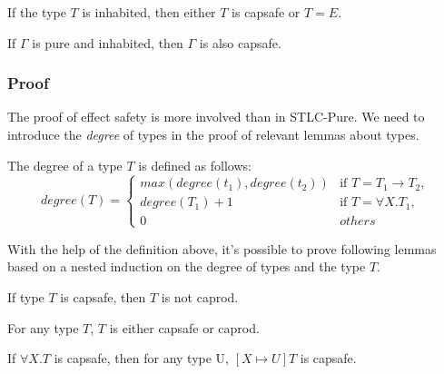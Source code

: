 \begin{lemma}
  If the type $T$ is inhabited, then either $T$ is capsafe or $T = E$.
\end{lemma}

\begin{theorem}
  If $\Gamma$ is pure and inhabited, then $\Gamma$ is also capsafe.
\end{theorem}


\subsubsection{Proof}

The proof of effect safety is more involved than in STLC-Pure. We need
to introduce the \emph{degree} of types in the proof of
relevant lemmas about types.

\begin{definition}
  The degree of a type $T$ is defined as follows:
  \begin{equation*}
    degree(T) =
    \begin{cases}
      max(degree(t_1), degree(t_2)) & \text{if } T = T_1 \to T_2,\\
      degree(T_1) + 1 & \text{if } T = \forall X.T_1,\\
      0 & others
    \end{cases}
  \end{equation*}
\end{definition}

With the help of the definition above, it's possible to prove
following lemmas based on a nested induction on the degree of types
and the type $T$.

\begin{lemma}
 If type $T$ is capsafe, then $T$ is not caprod.
\end{lemma}

\begin{lemma}
 For any type $T$, $T$ is either capsafe or caprod.
\end{lemma}

\begin{lemma}
  If $\forall X.T$ is capsafe, then for any type U, $[X \mapsto U]T$
  is capsafe.
\end{lemma}

